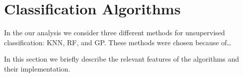 \section{Classification Algorithms\label{algos}}

In the our analysis we consider three different methods for unsupervised classification: \ac{KNN}, \ac{RF}, and \ac{GP}. These methods were chosen because of\dots {}

In this section we briefly describe the relevant features of the algorithms and their implementation. 







